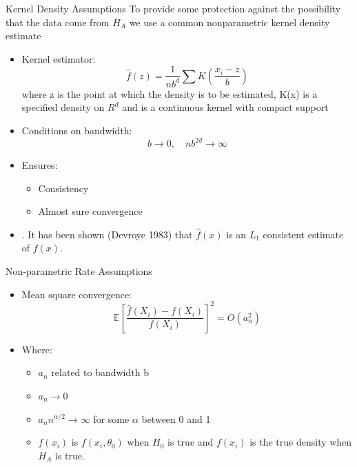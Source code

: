\begin{frame}{Kernel Density Assumptions}
To provide some protection against the possibility that the data come from $H_A$ we use a common nonparametric kernel density estimate
\begin{itemize}
    \item Kernel estimator:
    \[
    \hat{f}(z) = \frac{1}{n b^d} \sum K\left(\frac{x_i - z}{b}\right)
    \]
where z is the point at which the density is to be estimated, K(x) is a specified density on $R^d$ and is a continuous kernel with compact support
    \item Conditions on bandwidth:
    \[
    b \to 0, \quad n b^{2d} \to \infty
    \]

    \item Ensures:
    \begin{itemize}
        \item Consistency
        \item Almost sure convergence
    \end{itemize}

    \item . It has been shown (Devroye 1983) that $\hat f(x)$ is an $L_1$ consistent estimate of $f(x)$.
\end{itemize}
\end{frame}


\begin{frame}{Non-parametric Rate Assumptions }
\begin{itemize}
    \item Mean square convergence:
    \[
    \mathbb{E}\left[
    \frac{\hat{f}(X_i) - f(X_i)}{f(X_i)}
    \right]^2 = O(a_n^2)
    \]

    \item Where:
    \begin{itemize}
    \item $a_n$ related to bandwidth b
        \item $a_n \to 0$
        \item $a_n n^{\alpha/2} \to \infty$ for some $\alpha$ between 0 and 1
        \item $f(x_i)$ is $f(x_i, \theta_0)$ when $H_0$ is true and $f(x_i)$ is the true density when $H_A$ is true.
    \end{itemize}
\end{itemize}
\end{frame}


